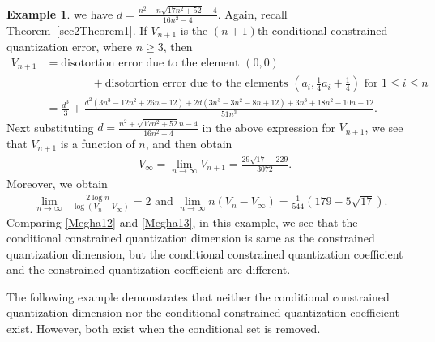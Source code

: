 \documentclass[12pt, reqno]{amsart}
\theoremstyle{plain}
\theoremstyle{definition}
\newtheorem{exam}[subsection]{Example}
\newcommand{\te}{\text}%
\begin{document}
\begin{exam}
we have $d=\frac{n^2+n\sqrt{17 n^2+52} -4}{16 n^2-4}$. Again, recall Theorem~\ref{sec2Theorem1}. If $V_{n+1}$ is the $(n+1)$th conditional constrained quantization error, where $n\geq 3$, then 
\begin{align*}
V_{n+1}&=\te{disotortion error due to the element } (0, 0) \\
&\qquad \qquad + \te{disotortion error due to the elements } (a_i, \frac 14 a_i+\frac 14) \te{ for } 1\leq i\leq n\\
&=\frac{d^3}{3}+\frac{d^2 \left(3 n^3-12 n^2+26 n-12\right)+2 d \left(3 n^3-3 n^2-8 n+12\right)+3 n^3+18 n^2-10 n-12}{51 n^3}. 
\end{align*} 
Next substituting $d=\frac{n^2+\sqrt{17 n^2+52} n-4}{16 n^2-4}$ in the above expression for $V_{n+1}$, we see that $V_{n+1}$ is a function of $n$, and then obtain 
\begin{align*}
& V_{\infty}=\lim_{n\to \infty} V_{n+1} =\frac{29 \sqrt{17}+229}{3072}.
\end{align*}
Moreover, we obtain
\begin{align} \label{Megha13}  
\lim_{n\to \infty}\frac{2\log n}{-\log (V_n-V_\infty)}=2 \te{ and } \lim_{n\to\infty} n(V_n-V_\infty)=\frac{1}{544} \left(179-5 \sqrt{17}\right).
\end{align} 
Comparing \eqref{Megha12} and \eqref{Megha13}, in this example, we see that the conditional constrained quantization dimension is same as the constrained quantization dimension, but the conditional constrained quantization coefficient and the constrained quantization coefficient are different.
 \end{exam} 
The following example demonstrates that neither the conditional constrained quantization dimension nor the conditional constrained quantization coefficient exist. However, both exist when the conditional set is removed.
\end{document}
